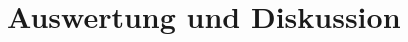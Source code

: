 
\chapter{Auswertung und Diskussion}
\label{chap:versuchsauswertung}



\newpage

\newpage

\newpage

